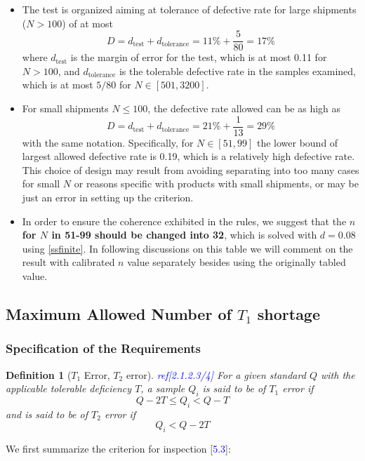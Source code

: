 \documentclass{article}
\newtheorem{definition}{Definition}[section]
\def\unf#1{\textcolor{blue}{#1}}
\begin{document}
\begin{itemize}
    \item The test is organized aiming at tolerance of defective rate for large shipments ($N > 100$) of at most 
    $$
    D = d_{\text{test}} + d_{\text{tolerance}} = 11\% + \frac{5}{80} = 17\%
    $$
    where $d_{\text{test}}$ is the margin of error for the test, which is at most 0.11 for $N > 100$, and $d_{\text{tolerance}}$ is the tolerable defective rate in the samples examined, which is at most $5/80$ for $N\in[501, 3200]$. 
    \item For small shipments $N \leq 100$, the defective rate allowed can be as high as
    $$
    D = d_{\text{test}} + d_{\text{tolerance}} = 21\% + \frac{1}{13} = 29\%
    $$
    with the same notation. Specifically, for $N\in[51, 99]$ the lower bound of largest allowed defective rate is 0.19, which is a relatively high defective rate. This choice of design may result from avoiding separating into too many cases for small $N$ or reasons specific with products with small shipments, or may be just an error in setting up the criterion.
    \item In order to ensure the coherence exhibited in the rules, we suggest that the \textbf{$n$ for $N$ in 51-99 should be changed into 32}, which is solved with $d=0.08$ using \ref{ssfinite}. In following discussions on this table we will comment on the result with calibrated $n$ value separately besides using the originally tabled value. 
\end{itemize}

\subsection{Maximum Allowed Number of $T_1$ shortage}

\subsubsection{Specification of the Requirements}

\begin{definition}[$T_1$ Error, $T_2$ error]
    \unf{ref[2.1.2.3/4]} For a given standard $Q$ with the applicable tolerable deficiency $T$, a sample $Q_i$ is said to be of $T_1$ error if
    $$
    Q-2T \leq Q_i < Q-T
    $$
    and is said to be of $T_2$ error if
    $$
    Q_i < Q-2T
    $$
\end{definition}

We first summarize the criterion for inspection [\unf{5.3}]:
\end{document}
